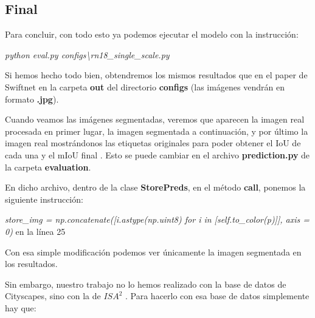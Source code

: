 \subsection{Final}

Para concluir, con todo esto ya podemos ejecutar el modelo con la instrucción:

\begin{center}
\textit{python eval.py configs\textbackslash{rn18\_single\_scale.py}}
\end{center}

Si hemos hecho todo bien, obtendremos los mismos resultados que en el paper de Swiftnet \cite{swiftnet} en la carpeta \textbf{out} del directorio \textbf{configs} (las imágenes vendrán en formato \textbf{.jpg}).

Cuando veamos las imágenes segmentadas, veremos que aparecen la imagen real procesada en primer lugar, la imagen segmentada a continuación, y por último la imagen real mostrándonos las etiquetas originales para poder obtener el \ac{IoU} de cada una y el \ac{mIoU} final \cite{miou-iou}. Esto se puede cambiar en el archivo \textbf{prediction.py} de la carpeta \textbf{evaluation}.

En dicho archivo, dentro de la clase \textbf{StorePreds}, en el método \textbf{call}, ponemos la siguiente instrucción:

\begin{center}
\textit{store\_img = np.concatenate([i.astype(np.uint8) for i in [self.to\_color(p)]], axis = 0)} en la línea 25
\end{center}

Con esa simple modificación podemos ver únicamente la imagen segmentada en los resultados.

Sin embargo, nuestro trabajo no lo hemos realizado con la base de datos de Cityscapes, sino con la de $ISA^{2}$ \cite{isa2}. Para hacerlo con esa base de datos simplemente hay que:

